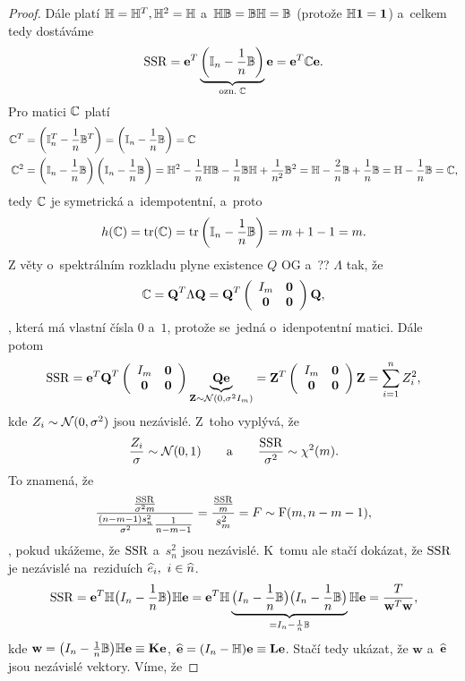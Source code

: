 \begin{proof}
Dále platí $\mathbb{H} = \mathbb{H}^T, \mathbb{H}^2 = \mathbb{H}$ a~$\mathbb{H} \mathbb{B} = \mathbb{B} \mathbb{H} = \mathbb{B}$ (protože $\mathbb{H} \mathbf{1} = \mathbf{1}$) a~celkem tedy dostáváme
 $$
\mathrm{SSR} = \mathbf{e}^T \underbrace{\left(\mathbb{I}_{n} - \frac{1}{n} \mathbb{B} \right)}_{\text{ozn.} \; \mathbb{C}} \mathbf{e} = \mathbf{e}^T \mathbb{C} \mathbf{e}.
 $$
Pro matici $\mathbb{C}$ platí
\begin{align*}
\mathbb{C}^T & = \left(\mathbb{I}_{n}^T - \frac{1}{n} \mathbb{B}^T \right) = \left(\mathbb{I}_{n} - \frac{1}{n} \mathbb{B} \right) = \mathbb{C} \\
\mathbb{C}^2 & = \left(\mathbb{I}_{n} - \frac{1}{n} \mathbb{B} \right)\left(\mathbb{I}_{n} - \frac{1}{n} \mathbb{B} \right) = \mathbb{H}^2 - \frac{1}{n} \mathbb{H} \mathbb{B} - \frac{1}{n} \mathbb{B} \mathbb{H} + \frac{1}{n^2} \mathbb{B}^2 = \mathbb{H} - \frac{2}{n} \mathbb{B} + \frac{1}{n} \mathbb{B} = \mathbb{H} - \frac{1}{n} \mathbb{B} = \mathbb{C},
\end{align*}
tedy $\mathbb{C}$ je symetrická a~idempotentní, a~proto
 $$
h(\mathbb{C}) = \text{tr}(\mathbb{C}) = \text{tr} \left(\mathbb{I}_{n} - \frac{1}{n} \mathbb{B} \right) = m + 1 - 1 = m.
 $$
Z věty o~spektrálním rozkladu plyne existence $Q$ OG a~?? $\Lambda$ tak, že
 $$ \mathbb{C} = \textbf{Q}^T \Lambda \textbf{Q} = \textbf{Q}^T \left(\begin{array}{cc}
I_m&\boldsymbol{0}  \\
\boldsymbol{0}& \boldsymbol{0}
\end{array}
 \right)\textbf{Q}, $$
, která má vlastní čísla $0$ a~$1$, protože se~jedná o~idenpotentní matici. Dále potom
 $$ \mathrm{SSR} = \mathbf{e}^T\textbf{Q}^T\left(\begin{array}{cc}
 I_m&\boldsymbol{0}  \\
 \boldsymbol{0}& \boldsymbol{0}
 \end{array}
 \right)\underbrace{\textbf{Q}\mathbf{e}}_{\mathbf{Z}\sim\mathcal{N}(0,\sigma^2 I_m)} = \mathbf{Z}^T\left(\begin{array}{cc}
 I_m&\boldsymbol{0}  \\
 \boldsymbol{0}& \boldsymbol{0}
 \end{array}
 \right)\mathbf{Z} = \sum\limits_{i=1}^{n} Z_i^2, $$
 kde $Z_i\sim\mathcal{N}(0,\sigma^2)$ jsou nezávislé. Z~toho vyplývá, že
 $$ \frac{Z_i}{\sigma}\sim\mathcal{N}(0,1)\qquad\text{a}\qquad\frac{\mathrm{SSR}}{\sigma^2}\sim\chi^2(m). $$
 To znamená, že
 $$ \frac{\frac{\mathrm{SSR}}{\sigma^2 m}}{\frac{(n-m-1)s_n^2}{\sigma^2}\frac{1}{n-m-1}} = \frac{\frac{\mathrm{SSR}}{m}}{s_m^2} = F\sim \mathrm{F}(m,n-m-1), $$
, pokud ukážeme, že $\mathrm{SSR}$ a~$s_n^2$ jsou nezávislé. K~tomu ale stačí dokázat, že $\mathrm{SSR}$ je nezávislé na~reziduích $\widehat{e}_i,~i\in\widehat{n}$.
 $$ \mathrm{SSR} = \mathbf{e}^T\mathbb{H}\big(I_n-\frac{1}{n}\mathbb{B} \big)\mathbb{H}\mathbf{e} = \mathbf{e}^T\mathbb{H}\underbrace{\big(I_n-\frac{1}{n}\mathbb{B}\big)\big(I_n-\frac{1}{n}\mathbb{B}\big)}_{ = I_n-\frac{1}{n}\mathbb{B}}\mathbb{H}\mathbf{e} = \frac{T}{\textbf{w}^T\textbf{w}}, $$
 kde $\textbf{w} = \big(I_n-\frac{1}{n}\mathbb{B}\big)\mathbb{H}\mathbf{e}\equiv \textbf{K}\mathbf{e}$, $\widehat{\mathbf{e}} = (I_n-\mathbb{H})\mathbf{e}\equiv \textbf{L}\mathbf{e}$. Stačí tedy ukázat, že $\textbf{w}$ a~$\widehat{\mathbf{e}}$ jsou nezávislé vektory. Víme, že

\end{proof}
